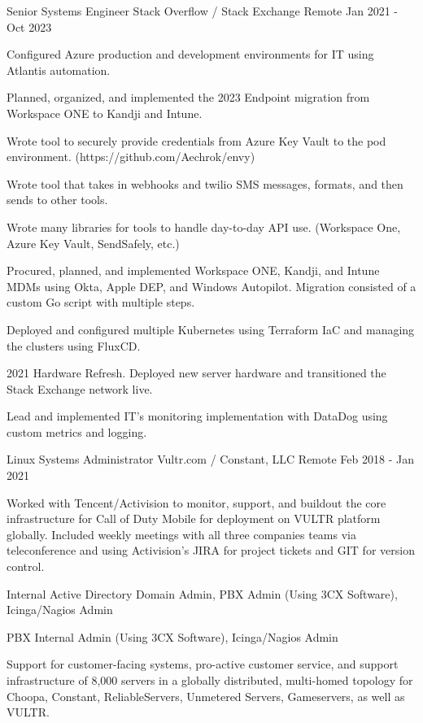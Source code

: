 
\begin{cventries}

	\cventry
	{Senior Systems Engineer}
	{Stack Overflow / Stack Exchange}
	{Remote}
	{Jan 2021 - Oct 2023}
	{
		\begin{cvitems}
		\item {Configured Azure production and development environments for IT using Atlantis automation.}
		\item {Planned, organized, and implemented the 2023 Endpoint migration from Workspace ONE to Kandji and Intune.}
		\item {Wrote tool to securely provide credentials from Azure Key Vault to the pod environment. (https://github.com/Aechrok/envy)}
		\item {Wrote tool that takes in webhooks and twilio SMS messages, formats, and then sends to other tools.}
		\item {Wrote many libraries for tools to handle day-to-day API use. (Workspace One, Azure Key Vault, SendSafely, etc.)}
		\item {Procured, planned, and implemented Workspace ONE, Kandji, and Intune MDMs using Okta, Apple DEP, and Windows Autopilot. Migration consisted of a custom Go script with multiple steps.}
		\item {Deployed and configured multiple Kubernetes using Terraform IaC and managing the clusters using FluxCD.}
		\item {2021 Hardware Refresh. Deployed new server hardware and transitioned the Stack Exchange network live.}
		\item {Lead and implemented IT's monitoring implementation with DataDog using custom metrics and logging.}
		\end{cvitems}
	}


	\cventry
	{Linux Systems Administrator}
	{Vultr.com / Constant, LLC}
	{Remote}
	{Feb 2018 - Jan 2021}
	{
		\begin{cvitems}
		\item {Worked with Tencent/Activision to monitor, support, and buildout the core infrastructure for Call of Duty Mobile for deployment on VULTR platform globally. Included weekly meetings with all three companies teams via teleconference and using Activision's JIRA for project tickets and GIT for version control.}
		\item {Internal Active Directory Domain Admin, PBX Admin (Using 3CX Software), Icinga/Nagios Admin}
		\item {PBX Internal Admin (Using 3CX Software), Icinga/Nagios Admin}
		\item {Support for customer-facing systems, pro-active customer service, and support infrastructure of 8,000 servers in a globally distributed, multi-homed topology for Choopa, Constant, ReliableServers, Unmetered Servers, Gameservers, as well as VULTR.}
		\end{cvitems}
	}


\end{cventries}
